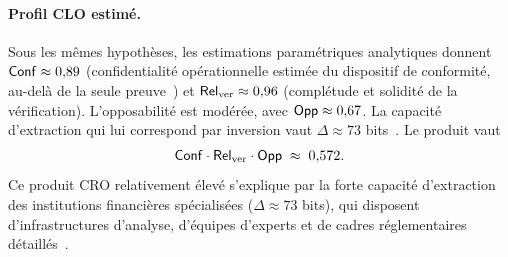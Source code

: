 \begin{sloppypar}
\paragraph{Profil CLO estim\'e.}
\label{par:zksnark_clo}

Sous les m\^emes hypoth\`eses, les estimations param\'etriques analytiques donnent
$\mathsf{Conf} \approx 0{,}89$ (confidentialit\'e op\'erationnelle estim\'ee du dispositif de conformit\'e, au-del\`a de la seule preuve~\cite{Groth16}) et
$\mathsf{Rel}_{\mathrm{ver}} \approx 0{,}96$ (compl\'etude et solidit\'e de la v\'erification).
L'opposabilit\'e est mod\'er\'ee, avec $\mathsf{Opp} \approx 0{,}67$. La capacit\'e
d'extraction qui lui correspond par inversion vaut $\Delta \approx 73$ bits~\cite{MINKA2026CRO}.
Le produit vaut
\begin{equation}
\mathsf{Conf} \cdot \mathsf{Rel}_{\mathrm{ver}} \cdot \mathsf{Opp} \;\approx\; 0{,}572.
\label{eq:zksnark_cro}
\end{equation}
Ce produit CRO relativement \'elev\'e s'explique par la forte capacit\'e
d'extraction des institutions financi\`eres sp\'ecialis\'ees ($\Delta \approx 73$ bits), qui disposent d'infrastructures
d'analyse, d'\'equipes d'experts et de cadres r\'eglementaires d\'etaill\'es~\cite{Ravi2020}.

\end{sloppypar}

